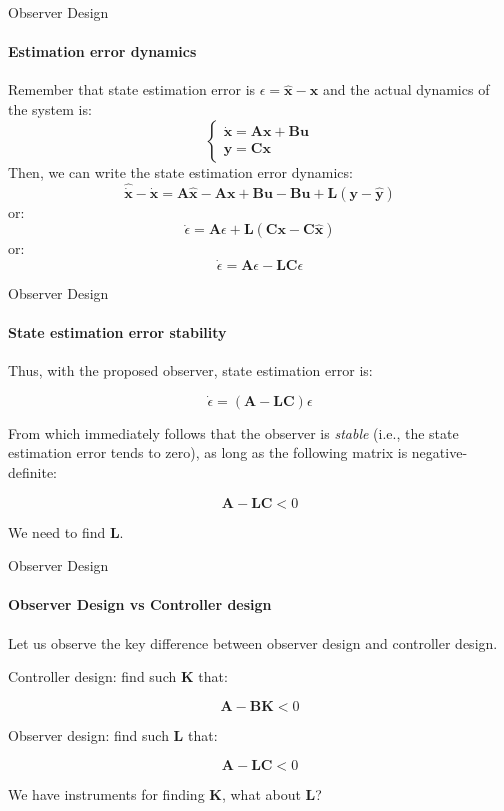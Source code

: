 \documentclass{beamer}
\begin{document}
\begin{frame}{Observer Design}
\framesubtitle{Estimation error dynamics}
\begin{flushleft}

Remember that state estimation error is $\epsilon = \hat{\mathbf x} - \mathbf x$ and the actual dynamics of the system is:
%
\[
\begin{cases}
\dot {\mathbf x} = \mathbf A \mathbf x + 
\mathbf B \mathbf u \\
\mathbf y = \mathbf C \mathbf x 
\end{cases}
\]
%
Then, we can write the state estimation error dynamics:
%
\[
\hat{\dot {\mathbf x}} - \dot {\mathbf x} = 
\mathbf A \hat{\mathbf x} - \mathbf A \mathbf x
+ \mathbf B \mathbf u - \mathbf B \mathbf u 
+ \mathbf L(\mathbf y - \hat{\mathbf y})
\]
%
or:
%
\[
\dot {\epsilon} = \mathbf A \epsilon + 
\mathbf L(\mathbf C \mathbf x - \mathbf C \hat{\mathbf x})
\]
%
or:
%
\[
\dot {\epsilon} = \mathbf A \epsilon - 
\mathbf L \mathbf C \epsilon
\]

\end{flushleft}
\end{frame}

\begin{frame}{Observer Design}
\framesubtitle{State estimation error stability}
\begin{flushleft}

Thus, with the proposed observer, state estimation error is:

\[
\dot {\epsilon} = (\mathbf A - 
\mathbf L \mathbf C) \epsilon
\]

From which immediately follows that the observer is \emph{stable} (i.e., the state estimation error tends to zero), as long as the following matrix is negative-definite:

\[
\mathbf A - 
\mathbf L \mathbf C < 0
\]

We need to find $\mathbf L$.

\end{flushleft}
\end{frame}



\begin{frame}{Observer Design}
\framesubtitle{Observer Design vs Controller design}
\begin{flushleft}

Let us observe the key difference between observer design and controller design.

\bigskip

Controller design: find such $\mathbf K$ that:

\[
\mathbf A - 
\mathbf B \mathbf K < 0
\]

Observer design: find such $\mathbf L$ that:

\[
\mathbf A - 
\mathbf L \mathbf C < 0
\]

We have instruments for finding $\mathbf K$, what about $\mathbf L$?

\end{flushleft}
\end{frame}
\end{document}
